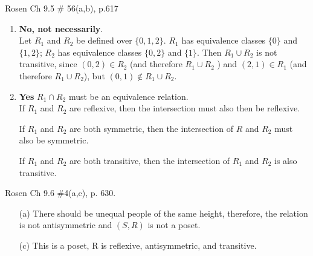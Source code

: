 \begin{questions}
    \ifprintanswers
        \vspace{-10pt}
    \fi
{} Rosen Ch 9.5 \# 56(a,b), p.617
    \ifprintanswers
        \vspace{-15pt}
    \fi
    \begin{solution}
    	\begin{enumerate}[label=(\alph*),itemsep=1pt,topsep=0pt]
    		\item \textbf{No, not necessarily}. \\
    		Let $R_1$ and $R_2$ be defined over $\{0,1,2\}$. $R_1$ has equivalence classes $\{0\}$ and $\{1,2\}$; $R_2$ has equivalence classes $\{0,2\}$ and $\{1\}$. Then $R_1 \cup R_2$ is not transitive, since $(0, 2) \in R_2$ (and therefore $R_1 \cup R_2$ ) and $(2, 1) \in  R_1$ (and therefore $R_1 \cup R_2$), but $(0, 1) \not\in R_1 \cup R_2$.

    		\item \textbf{Yes} $R_1 \cap R_2$ must be an equivalence relation. \\
    		If $R_1$ and $R_2$ are reflexive, then the intersection must also then be reflexive. 

		    If $R_1$ and $R_2$ are both symmetric, then the intersection of $R$ and $R_2$ must also be symmetric.

		    If $R_1$ and $R_2$ are both transitive, then the intersection of $R_1$ and $R_2$ is also transitive.

    	\end{enumerate}
    \end{solution}


    \ifprintanswers
        \vspace{-10pt}
    \fi
{} Rosen Ch 9.6 \#4(a,c), p. 630.
    \ifprintanswers
        \vspace{-15pt}
    \fi
    \begin{solution}
    \begin{itemize}[itemsep=0pt,parsep=0pt,topsep=0pt,partopsep=0pt]
        \item[(a)] There should be unequal people of the same height, therefore, the relation is not antisymmetric and $(S, R)$ is not a poset.
        \item[(c)] This is a poset, R is reflexive, antisymmetric, and transitive.
    \end{itemize}
    \end{solution}






\end{questions}
